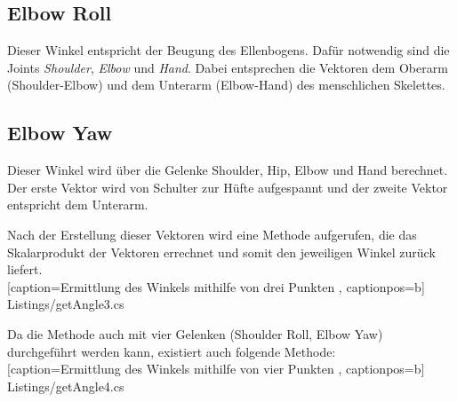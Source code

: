 \subsection{Elbow Roll}
Dieser Winkel entspricht der Beugung des Ellenbogens. Dafür notwendig sind die Joints \textit{Shoulder}, \textit{Elbow} und \textit{Hand}. Dabei entsprechen die Vektoren dem Oberarm (Shoulder-Elbow) und dem Unterarm (Elbow-Hand) des menschlichen Skelettes.

\subsection{Elbow Yaw}
Dieser Winkel wird über die Gelenke Shoulder, Hip, Elbow und Hand berechnet. Der erste Vektor wird von Schulter zur Hüfte aufgespannt und der zweite Vektor entspricht dem Unterarm. 


Nach der Erstellung dieser Vektoren wird eine Methode aufgerufen, die das Skalarprodukt der Vektoren errechnet und somit den jeweiligen Winkel zurück liefert. \\


    [caption={Ermittlung des Winkels mithilfe von drei Punkten}
       \label{lst:3joints},
       captionpos=b]
 {Listings/getAngle3.cs}



\noindent Da die Methode auch mit vier Gelenken (Shoulder Roll, Elbow Yaw) durchgeführt werden kann, existiert auch folgende Methode: \\


    [caption={Ermittlung des Winkels mithilfe von vier Punkten}
       \label{lst:4joints},
       captionpos=b]
 {Listings/getAngle4.cs}

